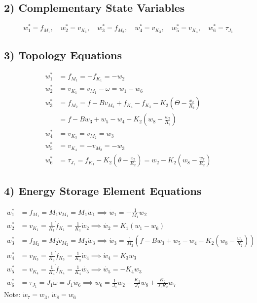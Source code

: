 \documentclass{article}
\begin{document}
\subsection*{2) Complementary State Variables}
\[
w_1^* = f_{M_1}, \quad w_2^* = v_{K_1}, \quad w_3^* = f_{M_2}, \quad w_4^* = v_{K_3}, \quad w_5^* = v_{K_4}, \quad w_6^* = \tau_{J_1}
\]

\subsection*{3) Topology Equations}
\begin{align*}
w_1^* &= f_{M_1} = -f_{K_1} = -w_2 \\
w_2^* &= v_{K_1} = v_{M_1} - \omega = w_1 - w_6 \\
w_3^* &= f_{M_2} = f - B v_{M_2} + f_{K_4} - f_{K_3} - K_2 \left( \Theta - \frac{x_2}{R_2} \right) \\
      &= f - B w_3 + w_5 - w_{4} - K_2 \left( w_8 - \frac{w_2}{R_2} \right) \\
w_4^* &= v_{K_3} = v_{M_2} = w_3 \\
w_5^* &= v_{K_4} = -v_{M_2} = -w_3 \\
w_6^* &= \tau_{J_1} = f_{K_1} - K_2 \left( \theta - \frac{x_2}{R_2} \right) = w_2 - K_2 \left( w_8 - \frac{w_7}{R_2} \right)
\end{align*}

\subsection*{4) Energy Storage Element Equations}
\begin{align*}
w_1^* &= f_{M_1} = M_1 \dot{v}_{M_1} = M_1 \dot{w}_1 \implies \dot{w}_1 = - \frac{1}{M_1} w_2 \\
w_2^* &= v_{K_1} = \frac{1}{K_1} \dot{f}_{K_1} = \frac{1}{K_1} \dot{w}_2 \implies \dot{w_2} = K_1 (w_1 - w_6) \\
w_3^* &= f_{M_2} = M_2 \dot{v}_{M_2} = M_2 \dot{w}_3 \implies \dot{w}_3 = \frac{1}{M_2} (f - B w_3 + w_5 - w_4 - K_2 (w_8 - \frac{w_7}{R_2})) \\
w_4^* &= v_{K_3} = \frac{1}{K_3} \dot{f}_{K_3} = \frac{1}{K_3} \dot{w}_4 \implies \dot{w}_4 = K_3 w_3 \\
w_5^* &= v_{K_4} = \frac{1}{K_4} \dot{f}_{K_4} = \frac{1}{K_4} \dot{w_5} \implies \dot{w_5} = -K_4 w_3 \\
w_6^* &= \tau_{J_1} = J_1 \dot{\omega} = J_1 \dot{w}_6 \implies \dot{w}_6 = \frac{1}{J_1} w_2 - \frac{K_2}{J_1} w_8 + \frac{K_2}{J_1 R_2} w_7
\end{align*}
Note: \( \dot{w}_7 = w_3 \), \( \dot{w}_8 = w_6 \)
\end{document}
